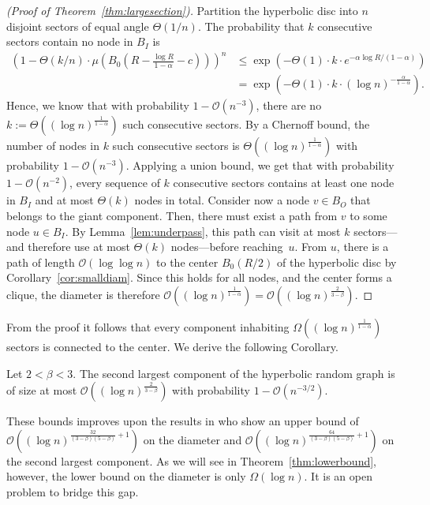 \documentclass{llncs}
\newcommand{\Oh}{\mathcal{O}}
\newcommand{\thmref}[1]{Theorem~\ref{thm:#1}}
\newcommand{\lemref}[1]{Lemma~\ref{lem:#1}}
\newcommand{\corref}[1]{Corollary~\ref{cor:#1}}
\renewcommand{\leq}{\leqslant}
\begin{document}
\begin{proof}[(Proof of \thmref{largesection})]
Partition the hyperbolic disc into $n$ disjoint sectors of equal angle $\Theta(1/n)$. The probability that $k$ consecutive sectors contain no node in $B_I$ is
\begin{align*}
(1- \Theta(k/n) \cdot \mu(B_0(R-\tfrac{\log R}{1-\alpha} - c)))^n &\leq \exp(- \Theta(1) \cdot k \cdot e^{-\alpha\log R/(1-\alpha)}) \\
&= \exp(-\Theta(1) \cdot k \cdot (\log n)^{-\frac\alpha{1-\alpha}}).
\end{align*}
Hence, we know that with probability $1- \Oh(n^{-3})$, there are no $k := \Theta((\log n)^{\frac{1}{1-\alpha}})$ such consecutive sectors. By a Chernoff bound, the number of nodes in $k$ such consecutive sectors is $\Theta((\log n)^{\frac1{1-\alpha}})$ with probability $1-\Oh(n^{-3})$. Applying a union bound, we get that with probability $1- \Oh(n^{-2})$, every sequence of $k$ consecutive sectors contains at least one node in $B_I$ and at most $\Theta(k)$ nodes in total. Consider now a node $v\in B_O$ that belongs to the giant component. Then, there must exist a path from $v$ to some node $u \in B_I$. By \lemref{underpass}, this path can visit at most $k$ sectors---and therefore use at most $\Theta(k)$ nodes---before reaching~$u$. From $u$, there is a path of length $\Oh(\log\log n)$ to the center $B_0(R/2)$ of the hyperbolic disc by \corref{smalldiam}. Since this holds for all nodes, and the center forms a clique, the diameter is therefore $\Oh((\log n)^{\frac{1}{1-\alpha}}) = \Oh((\log n)^{\frac{2}{3-\beta}})$.
\end{proof}
From the proof it follows that every component inhabiting $\Omega((\log n)^{\frac{1}{1-\alpha}})$ sectors is connected to the center. We derive the following Corollary.
\begin{corollary}
\label{cor:2ndcomp}
Let $2 < \beta < 3$. The second largest component of the hyperbolic random graph is of size at most $\Oh((\log n)^{\frac{2}{3-\beta}})$ with probability $1 - \Oh(n^{-3/2})$.
\end{corollary}
These bounds improves upon the results in \cite{KiwiMitsche15} who show an upper bound of $\Oh((\log n)^{\frac{32}{(3-\beta)(5-\beta)}+1})$ on the diameter and $\Oh((\log n)^{\frac{64}{(3-\beta)(5-\beta)}+1})$ on the second largest component.
As we will see in \thmref{lowerbound}, however, the lower bound on the diameter is only $\Omega(\log n)$. It is an open problem to bridge this gap.
\end{document}
